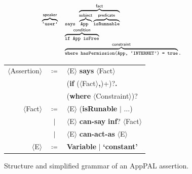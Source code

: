 \documentclass[]{llncs}
\begin{document}
\begin{figure}
  \newcommand{\bracetext}[1]{\text{\sffamily #1}}
  \newcommand{\smalltext}[1]{\text{\ttfamily\scriptsize #1}}
  \centering
  \begin{minipage}{0.49\linewidth}
    \begin{equation*}\small
      \begin{array}{r l}\footnotesize
        \overbrace{\smalltext{`user'}}^{\bracetext{speaker}} &
        \smalltext{ says }\overbrace{\overbrace{\smalltext{ App }}^{\bracetext{subject}}\overbrace{\smalltext{ isRunnable}}^{\bracetext{predicate}}}^{\bracetext{fact}} \\
        & \overbrace{\smalltext{ if App isFree}}^{\bracetext{condition}} \\
        & \overbrace{\smalltext{ where hasPermission(App, `INTERNET') = true}}^{\bracetext{constraint}}.
      \end{array}
    \end{equation*}
  \end{minipage}
  \begin{minipage}{0.49\linewidth}
  \newcommand{\nonterminal}[1]{$\langle$#1$\rangle$}
  \newcommand{\terminal}[1]{\textbf{#1}}
  \begin{tabular}{r c l}
    \footnotesize
    \nonterminal{Assertion} & $\coloneqq$ & \nonterminal{E} \terminal{says} \nonterminal{Fact} \\
                            &             & \hspace{1em}(\terminal{if} (\nonterminal{Fact}\terminal{,})+)?\terminal{.} \\
                            &             & \hspace{1em}(\terminal{where} \nonterminal{Constraint})? \\
    \nonterminal{Fact}      & $\coloneqq$ & \nonterminal{E} (\terminal{isRunable} $\vert$ $\ldots$) \\
                            & $\vert$     & \nonterminal{E} \terminal{can-say} \terminal{inf}? \nonterminal{Fact} \\
                            & $\vert$     & \nonterminal{E} \terminal{can-act-as} \nonterminal{E} \\
    \nonterminal{E}         & $\coloneqq$ & \terminal{Variable} $\vert$ \terminal{`constant'}
  \end{tabular}
  \end{minipage}
  \caption{Structure and simplified grammar of an AppPAL assertion.}
  \label{fig:assertion}
\end{figure}
\end{document}
